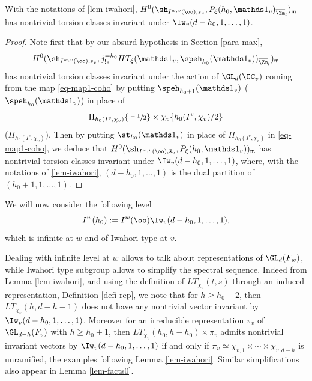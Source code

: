 \begin{lemma} \label{lem-oo-finite}
With the notations of \ref{lem-iwahori},
$H^0(\sh_{I^{w,v}(\oo),\bar s_v},P_\xi(h_0,\mathds 1_v)_{\overline \Zm_l})_{\mathfrak m}$ has nontrivial torsion
classes invariant under $\Iw_v(d-h_0,1,\dots,1)$.
\end{lemma}

\begin{proof}
Note first that by our absurd hypothesis in Section \ref{para-max},
\[
H^0(\sh_{I^{w,v}(\oo),\bar s_v},j^{=h_0}_{!*}
HT_\xi(\mathds 1_v,\speh_{h_0}(\mathds 1_v))_{\overline \Zm_l})_{\mathfrak m}
\]
has
nontrivial torsion classes invariant under the action of $\GL_d(\OC_v)$ coming
from the map \eqref{eq-map1-coho} by putting
$\speh_{h_0+1}(\mathds 1_v)$ (\resp $\speh_{h_0}(\mathds 1_v)$)
in place of
\[
\Pi_{h_0(I^v,\chi_v)} \{\sfrac{-1}{2}\} \times \chi_v \{h_0(I^v,\chi_v)/2\}
\]
(\resp $\Pi_{h_0(I^v,\chi_v)}$).
Then by putting $\st_{h_0}(\mathds 1_v)$ in place of $\Pi_{h_0(I^v,\chi_v)}$
in \eqref{eq-map1-coho}, we deduce that
$H^0(\sh_{I^{w,v}(\oo),\bar s_v},P_\xi(h_0,\mathds 1_v))_{\mathfrak m}$ has nontrivial torsion
classes invariant under $\Iw_v(d-h_0,1,\dots,1)$, where, with
the notations of \ref{lem-iwahori}, $(d-h_0,1,\dots,1)$ is the dual
partition of $(h_0+1,1,\dots,1)$.
\end{proof}

\begin{nota}
We will now consider the following level
\[
I^w(h_0):=I^w(\oo) \Iw_v(d-h_0,1,\dots,1),
\]
which is infinite at $w$ and of Iwahori type at $v$.
\end{nota}

\begin{remark}
Dealing with infinite level at $w$ allows to talk about
representations of $\GL_d(F_w)$, while
Iwahori type subgroup allows to simplify the spectral sequence. Indeed
from Lemma \ref{lem-iwahori}, and using the definition of $LT_{\chi_v}(t,s)$
through an induced representation, \cf Definition \ref{defi-rep},
we note that
for $h \geq h_0+2$, then $LT_{\chi_v}(h,d-h-1)$ does not have any nontrivial
vector invariant by $\Iw_v(d-h_0,1,\dots,1)$. Moreover for an irreducible
representation $\pi_v$ of $\GL_{d-h}(F_v)$ with $h \geq h_0+1$,
then \hbox{$LT_{\chi_v}(h_0,h-h_0) \times \pi_v$}
admits nontrivial invariant vectors by $\Iw_v(d-h_0,1,\dots,1)$ if and only if
$\pi_v \simeq \chi_{v,1} \times \cdots \times \chi_{v,d-h}$ is unramified, \cf the
examples following Lemma \ref{lem-iwahori}.
Similar simplifications also appear in Lemma \ref{lem-facts0}.
\end{remark}

